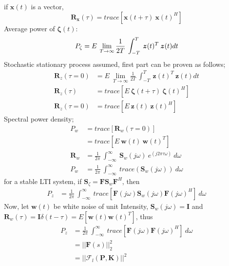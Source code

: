 \documentclass{scrreprt}
\begin{document}
if $\bm{x}(t)$ is a vector,
\begin{equation}
\bm{R_x}(\tau) = trace[\bm{x}(t + \tau)\: \bm{x}(t)^H]
\end{equation}
Average power of $\bm{\zeta}(t)$:
\begin{equation}
P_{\zeta} = E\:\lim_{T\to\infty} \frac{1}{2T}\:\int_{-T}^T\: \bm{z}(t)^T\: \bm{z}(t)dt \\
\end{equation}
Stochastic stationary process assumed, first part can be proven as follows;
\begin{align*}
\bm{R}_{z}(\tau=0) &= E\:\lim_{T\to\infty} \frac{1}{2T}\:\int_{-T}^T\: \bm{z}(t)^T\: \bm{z}(t)dt \\
\bm{R}_{z}(\tau) &= trace[E\:\bm{\zeta}(t + \tau)\: \bm{\zeta}(t)^H] \\
\bm{R}_{z}(\tau=0) &= trace[E\:\bm{z}(t)\: \bm{z}(t)^H]
\end{align*}
Spectral power density;
\begin{align*}
P_w &= trace[\bm{R}_w(\tau=0)] \\
	&= trace[E\:\bm{w}(t)\: \bm{w}(t)^T] \\
\bm{R}_w &= \frac{1}{2\pi}\: \int_{-\infty}^{\infty}\: \bm{S}_w(j\omega)\: e^{(j2\pi\tau\omega)}\:d\omega \\
P_w &= \frac{1}{2\pi}\: \int_{-\infty}^{\infty}\: trace(\bm{S}_w(j\omega))\: d\omega
\end{align*}
for a stable LTI system, if $\bm{S}_{\zeta}=\bm{F}\bm{S}_w\bm{F}^H$, then
\begin{align*}
P_z &= \frac{1}{2\pi}\: \int_{-\infty}^{\infty}\: trace[\bm{F}(j\omega)\bm{S}_w(j\omega)\bm{F}(j\omega)^H]\: d\omega
\end{align*}
Now, let $\bm{w}(t)$ be white noise of unit Intensity, $\bm{S}_w(j\omega)=\bm{I}$ and \\
$\bm{R}_w(\tau)= \bm{I}\delta(t - \tau)=E[\bm{w}(t)\bm{w}(t)^T]$, thus
\begin{align*}
P_z &= \frac{1}{2\pi}\: \int_{-\infty}^{\infty}\: trace[\bm{F}(j\omega)\bm{F}(j\omega)^H]\: d\omega \\
	&= ||\bm{F}(s)||_2^2 \\
	&= ||\mathcal{F}_l(\bm{P},\bm{K})||^2
\end{align*}
\end{document}
